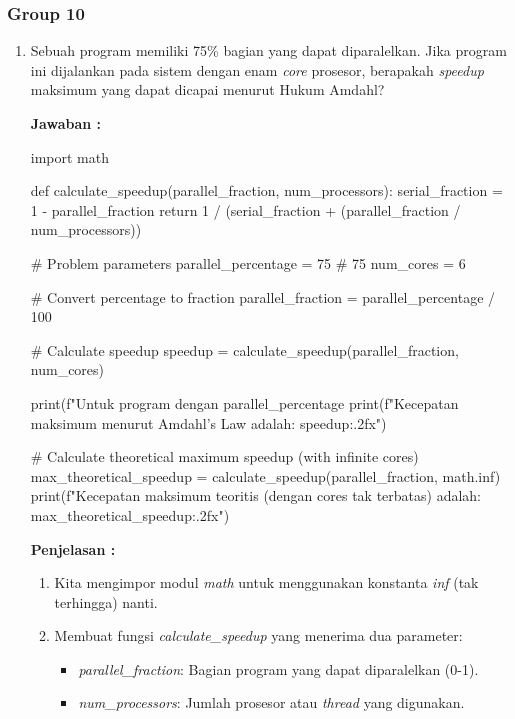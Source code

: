\documentclass[12pt]{article}
\begin{document}
\subsubsection{Group 10}
\begin{enumerate}
    \item Sebuah program memiliki 75\% bagian yang dapat diparalelkan. Jika program ini dijalankan pada sistem dengan enam \textit{core} prosesor, berapakah \textit{speedup} maksimum yang dapat dicapai menurut Hukum Amdahl?

    \textbf{Jawaban : }
    \begin{python}
    import math

    def calculate_speedup(parallel_fraction, num_processors):
        serial_fraction = 1 - parallel_fraction
        return 1 / (serial_fraction + (parallel_fraction / num_processors))
    
    # Problem parameters
    parallel_percentage = 75  # 75%
    num_cores = 6
    
    # Convert percentage to fraction
    parallel_fraction = parallel_percentage / 100
    
    # Calculate speedup
    speedup = calculate_speedup(parallel_fraction, num_cores)
    
    print(f"Untuk program dengan {parallel_percentage}%
    print(f"Kecepatan maksimum menurut Amdahl's Law adalah: {speedup:.2f}x")
    
    # Calculate theoretical maximum speedup (with infinite cores)
    max_theoretical_speedup = calculate_speedup(parallel_fraction, math.inf)
    print(f"Kecepatan maksimum teoritis (dengan cores tak terbatas) adalah: {max_theoretical_speedup:.2f}x")
\end{python}

    \textbf{Penjelasan : }
    \begin{enumerate}
        \item Kita mengimpor modul \textit{math} untuk menggunakan konstanta \textit{inf} (tak terhingga) nanti.
        
        \item Membuat fungsi \textit{calculate\_speedup} yang menerima dua parameter:
            \begin{itemize}
                \item \textit{parallel\_fraction}: Bagian program yang dapat diparalelkan (0-1).
                
                \item \textit{num\_processors}: Jumlah prosesor atau \textit{thread} yang digunakan.
            \end{itemize}
            

\end{enumerate}
\end{enumerate}
\end{document}
